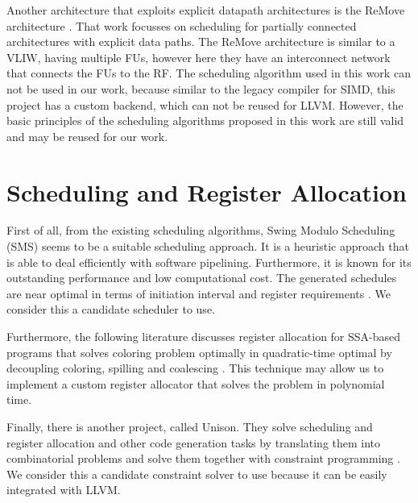 Another architecture that exploits explicit datapath architectures is the ReMove architecture \cite{remove}. That work focusses on scheduling for partially connected architectures with explicit data paths. The ReMove architecture is similar to a VLIW, having multiple FUs, however here they have an interconnect network that connects the FUs to the RF. The scheduling algorithm used in this work can not be used in our work, because similar to the legacy compiler for SIMD, this project has a custom backend, which can not be reused for LLVM. However, the basic principles of the scheduling algorithms proposed in this work are still valid and may be reused for our work.

\section{Scheduling and Register Allocation}
First of all, from the existing scheduling algorithms, Swing Modulo Scheduling (SMS) seems to be a suitable scheduling approach. It is a heuristic approach that is able to deal efficiently with software pipelining. Furthermore, it is known for its outstanding performance and low computational cost. The generated schedules are near optimal in terms of initiation interval and register requirements \cite{swingmodulo_paper, swingmodulo_thesis}. We consider this a candidate scheduler to use.

Furthermore, the following literature discusses register allocation for SSA-based programs that solves coloring problem optimally in quadratic-time optimal by decoupling coloring, spilling and coalescing \cite{ra}. This technique may allow us to implement a custom register allocator that solves the problem in polynomial time.

Finally, there is another project, called Unison. They solve scheduling and register allocation and other code generation tasks by translating them into combinatorial problems and solve them together with constraint programming \cite{unison}. We consider this a candidate constraint solver to use because it can be easily integrated with LLVM.